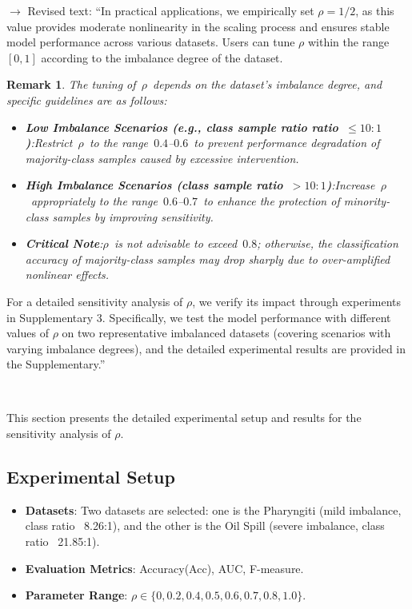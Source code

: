 \documentclass[journal,12pn, onecolumn]{IEEEtran}
\newtheorem{remark}{Remark}
\begin{document}
{{{{{{%
{\color{orange}$\longrightarrow$ Revised text: ``In practical applications, we empirically set $\rho = 1/2$, as this value provides moderate nonlinearity in the scaling process and ensures stable model performance across various datasets. Users can tune $\rho$ within the range $[0, 1]$ according to the imbalance degree of the dataset.
\begin{remark}\label{remark 1}
The tuning of \(\rho\) depends on the dataset's imbalance degree, and specific guidelines are as follows:\begin{itemize}\item \textbf{Low Imbalance Scenarios (e.g., class sample ratio ratio \(\leq 10:1\))}:Restrict \(\rho\) to the range \(0.4\)--\(0.6\) to prevent performance degradation of majority-class samples caused by excessive intervention.\item \textbf{High Imbalance Scenarios (class sample ratio \(> 10:1\))}:Increase \(\rho\) appropriately to the range \(0.6\)--\(0.7\) to enhance the protection of minority-class samples by improving sensitivity.\item \textbf{Critical Note}:\(\rho\) is not advisable to exceed \(0.8\); otherwise, the classification accuracy of majority-class samples may drop sharply due to over-amplified nonlinear effects.\end{itemize}\end{remark}
For a detailed sensitivity analysis of $\rho$, we verify its impact through experiments in Supplementary 3. Specifically, we test the model performance with different values of $\rho$ on two representative imbalanced datasets (covering scenarios with varying imbalance degrees), and the detailed experimental results are provided in the Supplementary.''}\\

{\color{black}{$\blacktriangleright\blacktriangleright$ Supplementary 3: Sensitivity Analysis of Parameter $\rho$\\
\par}}

{\color{orange}This section presents the detailed experimental setup and results for the sensitivity analysis of $\rho$. 

\subsection{Experimental Setup}
\begin{itemize}
    \item \textbf{Datasets}: Two datasets are selected: one is the Pharyngiti (mild imbalance, class ratio ~8.26:1), and the other is the Oil Spill (severe imbalance, class ratio ~21.85:1).
    \item \textbf{Evaluation Metrics}: Accuracy(Acc), AUC, F-measure.
    \item \textbf{Parameter Range}: $\rho \in \{0, 0.2, 0.4, 0.5, 0.6, 0.7, 0.8, 1.0\}$.
\end{itemize}

}}}}}}}
\end{document}
